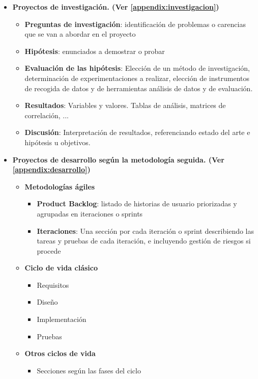 \begin{itemize}
    \item \textbf{Proyectos de investigación. (Ver \ref{appendix:investigacion})}
    \begin{itemize}
                \item \textbf{Preguntas de investigación}: identificación de problemas o carencias que se van a abordar en el proyecto 
                \item \textbf{Hipótesis}: enunciados a demostrar o probar
                \item \textbf{Evaluación de las hipótesis}: Elección de un método de investigación, determinación de experimentaciones a realizar, elección de instrumentos de recogida de datos y de herramientas análisis de datos y de evaluación.
                \item \textbf{Resultados}: Variables y valores. Tablas de análisis, matrices de correlación, ...
                \item \textbf{Discusión}: Interpretación de resultados, referenciando estado del arte e hipótesis u objetivos.
    \end{itemize}
    
    \item \textbf{Proyectos de desarrollo según la metodología seguida. (Ver \ref{appendix:desarrollo})}
        \begin{itemize}
            \item \textbf{Metodologías ágiles}
                \begin{itemize}
                    \item \textbf{Product Backlog}: listado de historias de usuario priorizadas y agrupadas en iteraciones o sprints
                    \item \textbf{Iteraciones}: Una sección por cada iteración o sprint describiendo las tareas y pruebas de cada iteración, e incluyendo gestión de riesgos si procede
                \end{itemize}
            \item \textbf{Ciclo de vida clásico}
                \begin{itemize}
                    \item Requisitos
                    \item Diseño
                    \item Implementación
                    \item Pruebas
                \end{itemize}
            \item \textbf{Otros ciclos de vida}
                \begin{itemize}
                    \item Secciones según las fases del ciclo
                \end{itemize}
        \end{itemize}
        

\end{itemize}
